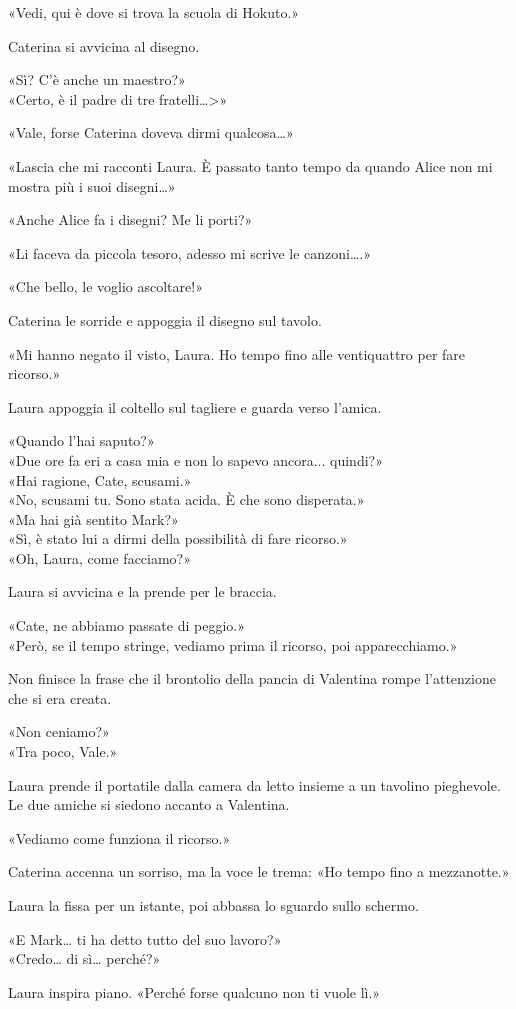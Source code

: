 «Vedi, qui è dove si trova la scuola di Hokuto.»

Caterina si avvicina al disegno.

«Sì? C’è anche un maestro?»\\
«Certo, è il padre di tre fratelli…>»

«Vale, forse Caterina doveva dirmi qualcosa…»

«Lascia che mi racconti Laura. È passato tanto tempo da quando Alice non mi mostra più i suoi disegni…»

«Anche Alice fa i disegni? Me li porti?»

«Li faceva da piccola tesoro, adesso mi scrive le canzoni….»

«Che bello, le voglio ascoltare!»

Caterina le sorride e appoggia il disegno sul tavolo.

«Mi hanno negato il visto, Laura. Ho tempo fino alle ventiquattro per fare ricorso.»

Laura appoggia il coltello sul tagliere e guarda verso l’amica.

«Quando l’hai saputo?»\\
«Due ore fa eri a casa mia e non lo sapevo ancora... quindi?»\\
«Hai ragione, Cate, scusami.»\\
«No, scusami tu. Sono stata acida. È che sono disperata.»\\
«Ma hai già sentito Mark?»\\
«Sì, è stato lui a dirmi della possibilità di fare ricorso.»\\
«Oh, Laura, come facciamo?»

Laura si avvicina e la prende per le braccia.

«Cate, ne abbiamo passate di peggio.»\\
«Però, se il tempo stringe, vediamo prima il ricorso, poi apparecchiamo.»

Non finisce la frase che il brontolio della pancia di Valentina rompe l’attenzione che si era creata.

«Non ceniamo?»\\

«Tra poco, Vale.»

Laura prende il portatile dalla camera da letto insieme a un tavolino pieghevole. Le due amiche si siedono accanto a Valentina.

«Vediamo come funziona il ricorso.»

Caterina accenna un sorriso, ma la voce le trema: «Ho tempo fino a mezzanotte.»

Laura la fissa per un istante, poi abbassa lo sguardo sullo schermo.

«E Mark… ti ha detto tutto del suo lavoro?»\\
«Credo… di sì… perché?»

Laura inspira piano. «Perché forse qualcuno non ti vuole lì.»
